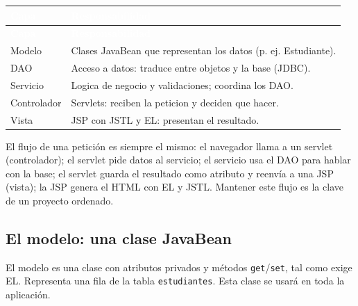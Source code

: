 \documentclass[11pt]{article}
\begin{document}
{\renewcommand{\arraystretch}{1.25}
\begin{longtable}{>{\raggedright\arraybackslash}p{2.8cm} >{\raggedright\arraybackslash}p{12.6cm}}
\rowcolor{jwebazul}\textcolor{white}{\textbf{Capa}} & \textcolor{white}{\textbf{Responsabilidad}} \\
\endfirsthead
\rowcolor{jwebazul}\textcolor{white}{\textbf{Capa}} & \textcolor{white}{\textbf{Responsabilidad}} \\
\endhead
\ttfamily\color{jwebazul}Modelo & Clases JavaBean que representan los datos (p. ej. Estudiante). \\ \hline
\ttfamily\color{jwebazul}DAO & Acceso a datos: traduce entre objetos y la base (JDBC). \\ \hline
\ttfamily\color{jwebazul}Servicio & Logica de negocio y validaciones; coordina los DAO. \\ \hline
\ttfamily\color{jwebazul}Controlador & Servlets: reciben la peticion y deciden que hacer. \\ \hline
\ttfamily\color{jwebazul}Vista & JSP con JSTL y EL: presentan el resultado. \\ \hline
\end{longtable}}
El flujo de una petición es siempre el mismo: el navegador llama a un servlet (controlador); el servlet pide datos al servicio; el servicio usa el DAO para hablar con la base; el servlet guarda el resultado como atributo y reenvía a una JSP (vista); la JSP genera el HTML con EL y JSTL. Mantener este flujo es la clave de un proyecto ordenado.

\subsection{El modelo: una clase JavaBean}
El modelo es una clase con atributos privados y métodos \texttt{get}/\texttt{set}, tal como exige EL. Representa una fila de la tabla \texttt{estudiantes}. Esta clase se usará en toda la aplicación.
\end{document}
